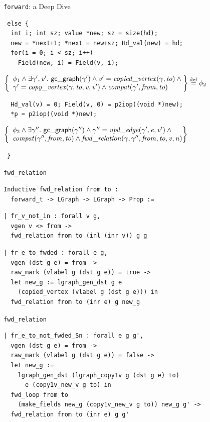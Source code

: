 \documentclass[usenames, xcolor=dvipsnames]{beamer}
\makeatletter
\newcommand{\defeq}{\mathbin{\overset{\mathrm{def}}{=}}}
\newcommand{\braces}[1]{\left\{\begin{array}{l@{}} #1 \end{array}\right\}}
\newcommand{\m}[1]{\ensuremath{\mathit{#1}}} %
\newcommand{\p}[1]{\ensuremath{\mathsf{#1}}} %
\makeatother
\begin{document}
\begin{frame}[fragile]{\texttt{forward}: a Deep Dive}
\begin{Verbatim}
 else {
  int i; int sz; value *new; sz = size(hd); 
  new = *next+1; *next = new+sz; Hd_val(new) = hd;
  for(i = 0; i < sz; i++)
    Field(new, i) = Field(v, i);
\end{Verbatim}
\pause
$\braces{\phi_{1} \wedge \exists \ga', \m{v'}.~\p{gc\_graph}(\ga') \wedge 
\m{v'} = \m{copied\_vertex(\ga, \m{to})} \wedge \null \\ \ga' = \m{copy\_vertex}(\gamma, \m{to}, \m{v}, \m{v'}) \wedge \m{compat}(\ga', \m{from}, \m{to})} \defeq \phi_{2}$
\pause
\begin{Verbatim}
  Hd_val(v) = 0; Field(v, 0) = p2iop((void *)new);
  *p = p2iop((void *)new);
\end{Verbatim}
\pause
$\braces{\phi_{2} \wedge \exists \ga''.~\p{gc\_graph}(\ga'') \wedge \ga'' = \m{upd\_edge}(\ga', \m{e}, \m{v'}) \wedge \null \\ 
\m{compat}(\ga'', \m{from}, \m{to}) \wedge \m{fwd\_relation}(\ga, \ga'', \m{from}, \m{to}, \m{v}, \m{n})}$
\begin{Verbatim}
 }
\end{Verbatim}
\end{frame}

\begin{frame}[fragile]{\texttt{fwd\_relation}}
\begin{Verbatim}
Inductive fwd_relation from to : 
  forward_t -> LGraph -> LGraph -> Prop :=
\end{Verbatim}
\pause
\begin{Verbatim}
| fr_v_not_in : forall v g,
  vgen v <> from ->
  fwd_relation from to (inl (inr v)) g g
\end{Verbatim}
\pause
\begin{Verbatim}
| fr_e_to_fwded : forall e g,
  vgen (dst g e) = from ->
  raw_mark (vlabel g (dst g e)) = true ->
  let new_g := lgraph_gen_dst g e
    (copied_vertex (vlabel g (dst g e))) in
  fwd_relation from to (inr e) g new_g
\end{Verbatim}
\end{frame}

\begin{frame}[fragile]{\texttt{fwd\_relation}}
\begin{Verbatim}
| fr_e_to_not_fwded_Sn : forall e g g', 
  vgen (dst g e) = from ->
  raw_mark (vlabel g (dst g e)) = false -> 
  let new_g :=
    lgraph_gen_dst (lgraph_copy1v g (dst g e) to)
      e (copy1v_new_v g to) in 
  fwd_loop from to
    (make_fields new_g (copy1v_new_v g to)) new_g g' ->
  fwd_relation from to (inr e) g g'
\end{Verbatim} 
\end{frame}
\end{document}
